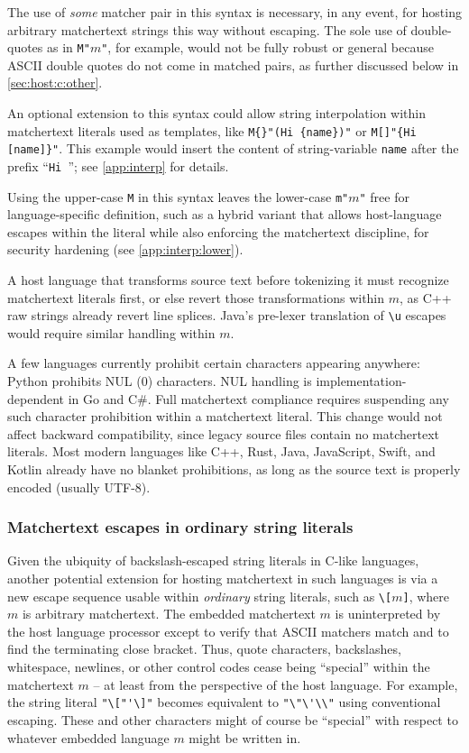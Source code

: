 The use of \emph{some} matcher pair in this syntax is necessary,
in any event,
for hosting arbitrary matchertext strings this way without escaping.
The sole use of double-quotes as in \verb|M"|$m$\verb|"|, for example,
would not be fully robust or general
because ASCII double quotes do not come in matched pairs,
as further discussed below in \cref{sec:host:c:other}.

An optional extension to this syntax
could allow string interpolation
within matchertext literals used as templates,
like \verb|M{}"(Hi {name})"| or \verb|M[]"{Hi [name]}"|.
This example would insert the content of string-variable \verb|name|
after the prefix ``\verb|Hi |'';
see \cref{app:interp} for details.

Using the upper-case \verb|M| in this syntax
leaves the lower-case \verb|m"|$m$\verb|"|
free for language-specific definition,
such as a hybrid variant that allows host-language escapes
within the literal
while also enforcing the matchertext discipline,
\eg for security hardening (see \cref{app:interp:lower}).

A host language that transforms source text before tokenizing it
must recognize matchertext literals first,
or else revert those transformations within $m$,
as C++ raw strings already revert line splices.
Java's pre-lexer translation of \verb|\u| escapes
would require similar handling within $m$.

A few languages currently prohibit certain characters appearing anywhere:
\eg Python prohibits NUL (0) characters.
NUL handling is implementation-dependent in Go and C\#.
Full matchertext compliance requires suspending any such character prohibition
within a matchertext literal.
This change would not affect backward compatibility,
since legacy source files contain no matchertext literals.
Most modern languages
like C++, Rust, Java, JavaScript, Swift, and Kotlin
already have no blanket prohibitions,
as long as the source text is properly encoded (usually UTF-8).


\subsubsection{Matchertext escapes in ordinary string literals}
\label{sec:host:c:escapes}

Given the ubiquity of backslash-escaped string literals in C-like languages,
another potential extension for hosting matchertext in such languages
is via a new escape sequence
usable within \emph{ordinary} string literals,
such as \verb|\[|$m$\verb|]|,
where $m$ is arbitrary matchertext.
The embedded matchertext $m$ is uninterpreted by the host language processor
except to verify that ASCII matchers match
and to find the terminating close bracket.
Thus, quote characters, backslashes, whitespace, newlines,
or other control codes cease being ``special'' within the matchertext $m$ --
at least from the perspective of the host language.
For example, the string literal \verb|"\["'\]"|
becomes equivalent to \verb|"\"\'\\"| using conventional escaping.
These and other characters might of course be ``special'' with respect to
whatever embedded language $m$ might be written in.

